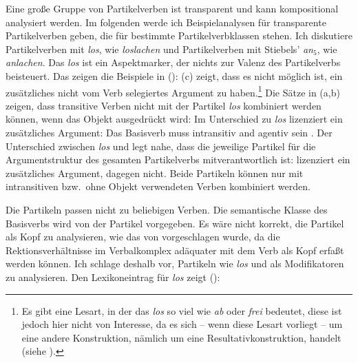 Eine große Gruppe von Partikelverben ist transparent und kann kompositional analysiert
werden. Im folgenden werde ich Beispielanalysen für transparente Partikelverben geben,
die für bestimmte Partikelverbklassen stehen. Ich diskutiere Partikelverben mit \emph{los},
wie \zb \emph{loslachen} und Partikelverben mit Stiebels' \emph{an$_5$}, wie \zb \emph{anlachen}.
Das \emph{los} ist ein Aspektmarker, der nichts zur Valenz des Partikelverbs beisteuert.
Das zeigen die Beispiele in ():
\eal
{}
\zl
(c) zeigt, dass es nicht möglich ist, ein zusätzliches nicht vom Verb
selegiertes Argument zu haben.\footnote{
  Es gibt eine Lesart, in der das \emph{los} so viel wie \emph{ab} oder \emph{frei}
  bedeutet, diese ist jedoch hier nicht von Interesse,
  da es sich -- wenn diese Lesart vorliegt -- um eine andere Konstruktion,
  nämlich um eine Resultativkonstruktion, handelt
  (siehe ).%
}
Die Sätze in (a,b) zeigen, dass transitive Verben nicht mit der Partikel \emph{los}
kombiniert werden können, wenn das Objekt ausgedrückt wird:
\eal
{}
\zl
Im Unterschied zu \emph{los} lizenziert \anf ein zusätzliches Argument:
\eal
{}
\zl
Das Basisverb muss intransitiv and agentiv
sein \citep[]{SW94a}. Der Unterschied zwischen \emph{los} und \anf legt nahe,
dass die jeweilige Partikel für die Argumentstruktur des gesamten Partikelverbs
mitverantwortlich ist: \anf lizenziert ein zusätzliches Argument, \los dagegen nicht.
Beide Partikeln können nur mit intransitiven bzw.\ ohne Objekt verwendeten Verben
kombiniert werden.

Die Partikeln passen nicht zu beliebigen Verben. Die semantische Klasse
des Basisverbs wird von der Partikel vorgegeben. Es wäre nicht korrekt, die Partikel
als Kopf zu analysieren, wie das \zb von \citet[]{Trost91a} vorgeschlagen wurde, 
da die Rektionsverhältnisse im Verbalkomplex adäquater
mit dem Verb als Kopf erfaßt werden können. Ich schlage deshalb vor,
Partikeln wie \emph{los} und \anf als Modifikatoren zu analysieren. Den Lexikoneintrag
für \emph{los} zeigt ():

